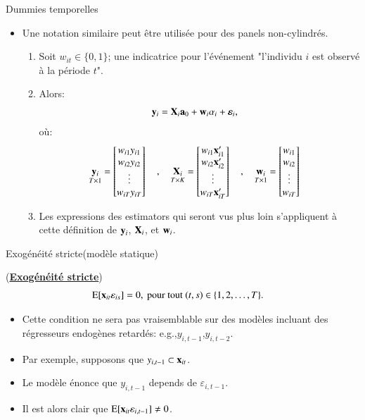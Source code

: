 \begin{frame}[allowframebreaks]{Dummies temporelles}
\begin{itemize}
\item Une notation similaire peut être utilisée pour des panels non-cylindrés.
\begin{enumerate}[$\star$]
\item Soit  $w_{it} \in\{0, 1\}$; une indicatrice pour l'événement  "l'individu $i$ est observé à la période $t$". 
\item Alors:
\begin{align*}
{\mathbf y}_i &= \mathbf X_i {\mathbf a}_0 + {\mathbf w}_i \alpha_i + {\boldsymbol \varepsilon}_i,
\end{align*}
où:
\begin{align*}
    \underset{T\times 1}{{\mathbf y}_i} &= \begin{bmatrix}
    w_{i1}y_{i1}\\
    w_{i2}y_{i2}\\
    \vdots\\
    w_{iT}y_{iT}
    \end{bmatrix}
    \quad , \quad
    \underset{T\times K}{\mathbf X_i} =  \begin{bmatrix}
    w_{i1}{\mathbf x}_{i1}^\prime\\
    w_{i2}{\mathbf x}_{i2}^\prime\\
    \vdots\\
    w_{iT}{\mathbf x}_{iT}^\prime
    \end{bmatrix}
    \quad , \quad
\underset{T\times 1}{{\mathbf w}_i} = \begin{bmatrix}
w_{i1}\\
w_{i2}\\
\vdots\\
w_{iT}
\end{bmatrix}
\end{align*}
\item Les expressions des estimators qui seront vus plus loin s'appliquent à cette définition
 de ${\mathbf y}_i$, $\mathbf X_i$, et ${\mathbf w}_i$.
\end{enumerate}
    \end{itemize}
\end{frame}    

\begin{frame}[allowframebreaks]{Exogénéité stricte(modèle statique)}
\begin{condition}(\textbf{\underline{Exogénéité stricte}})
\begin{align*}
    \Exp[\boldx_{it}\varepsilon_{is}] &= 0, \ \text{pour tout} \ (t,s)\in\{1, 2,\ldots, T\}.
\end{align*}
\end{condition}
\begin{itemize}
\item Cette condition ne sera pas vraisemblable sur des modèles incluant des régresseurs endogènes retardés:
 e.g.,$y_{i, t-1}$,$y_{i, t-2}$. 
 \item Par exemple, supposons que $y_{i,t-1}\subset {\mathbf x}_{it}$. 
 \item Le modèle énonce que $y_{i,t-1}$ depends de $\varepsilon_{i,t-1}$. 
 \item Il est alors clair que $\operatorname{E}[{\mathbf x}_{it} \varepsilon_{i,t-1}]\neq 0$.
\end{itemize}
\end{frame}

